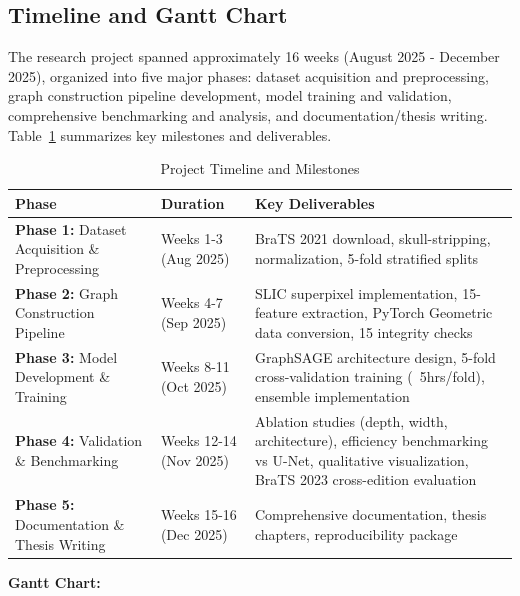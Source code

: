 \documentclass{article}
\begin{document}
\subsection{Timeline and Gantt Chart}

The research project spanned approximately 16 weeks (August 2025 - December 2025), organized into five major phases: dataset acquisition and preprocessing, graph construction pipeline development, model training and validation, comprehensive benchmarking and analysis, and documentation/thesis writing. Table~\ref{tab:timeline} summarizes key milestones and deliverables.

\begin{table}[htbp]
\caption{Project Timeline and Milestones}
\label{tab:timeline}
\begin{center}
\begin{tabularx}{\textwidth} { 
  | >{\raggedright\arraybackslash}X 
  | >{\centering\arraybackslash}X 
  | >{\raggedright\arraybackslash}X 
  | }
\hline
\textbf{Phase} & \textbf{Duration} & \textbf{Key Deliverables}\\
\hline
\textbf{Phase 1:} Dataset Acquisition \& Preprocessing & Weeks 1-3 (Aug 2025) & BraTS 2021 download, skull-stripping, normalization, 5-fold stratified splits\\
\hline
\textbf{Phase 2:} Graph Construction Pipeline & Weeks 4-7 (Sep 2025) & SLIC superpixel implementation, 15-feature extraction, PyTorch Geometric data conversion, 15 integrity checks\\
\hline
\textbf{Phase 3:} Model Development \& Training & Weeks 8-11 (Oct 2025) & GraphSAGE architecture design, 5-fold cross-validation training (~5hrs/fold), ensemble implementation\\
\hline
\textbf{Phase 4:} Validation \& Benchmarking & Weeks 12-14 (Nov 2025) & Ablation studies (depth, width, architecture), efficiency benchmarking vs U-Net, qualitative visualization, BraTS 2023 cross-edition evaluation\\
\hline
\textbf{Phase 5:} Documentation \& Thesis Writing & Weeks 15-16 (Dec 2025) & Comprehensive documentation, thesis chapters, reproducibility package\\
\hline
\end{tabularx}
\end{center}
\end{table}

\textbf{Gantt Chart:}
\end{document}
